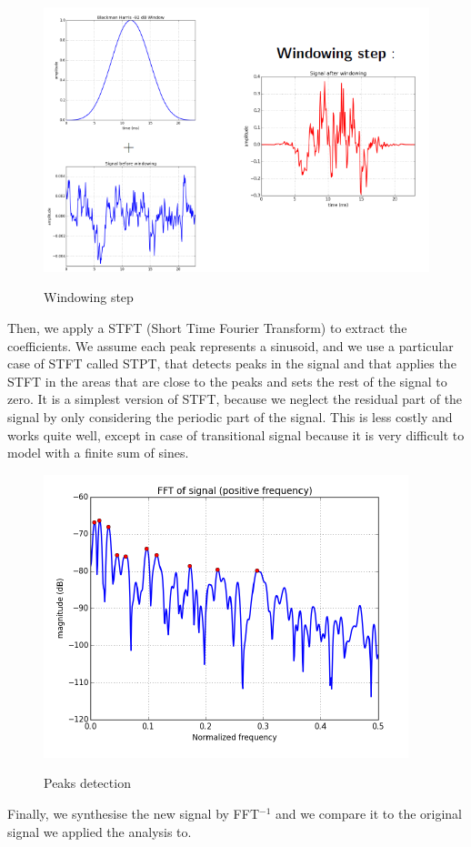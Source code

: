\documentclass[]{article}
\begin{document}
\begin{figure}[H]
	\centering
	{\includegraphics[scale=0.4]{slide1.png}}
	\caption{ Windowing step}
	\label{windowing}
\end{figure}

\medskip

Then, we apply a STFT (Short Time Fourier Transform) to extract the coefficients.  We assume each peak represents a sinusoid, and we use a particular case of STFT called STPT, that detects peaks in the signal and that applies the STFT in the areas that are close to the peaks and sets the rest of the signal to zero. It is a simplest version of STFT, because we neglect the residual part of the signal by only considering the periodic part of the signal. This is less costly and works quite well, except in case of transitional signal because it is very difficult to model with a finite sum of sines. 

\begin{figure} [H]
	\centering
	{\includegraphics[scale=0.7]{slide2.png}}
	\caption{ Peaks detection}
\end{figure}
\medskip
Finally, we synthesise the new signal by FFT$^{-1}$ and we compare it to the original signal we applied the analysis to.
\end{document}
